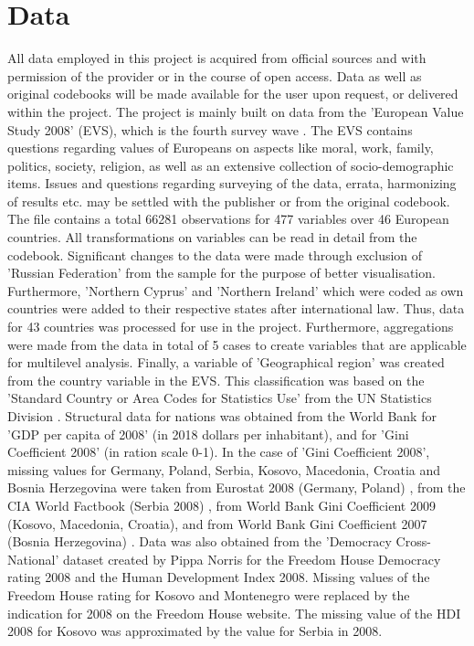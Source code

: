 \documentclass[preprint,12pt,authoryear]{elsarticle}
\begin{document}
\section{Data}
All data employed in this project is acquired from official sources and with permission of the provider or in the course of open access. Data as well as original codebooks will be made available for the user upon request, or delivered within the project.
The project is mainly built on data from the 'European Value Study 2008' (EVS), which is the fourth survey wave \citep{evs_european_2016}. The EVS contains questions regarding values of Europeans on aspects like moral, work, family, politics, society, religion, as well as an extensive collection of socio-demographic items. Issues and questions regarding surveying of the data, errata, harmonizing of results etc. may be settled with the publisher or from the original codebook. The file contains a total 66281 observations for 477 variables over 46 European countries. All transformations on variables can be read in detail from the codebook. Significant changes to the data were made through exclusion of 'Russian Federation' from the sample for the purpose of better visualisation. Furthermore, 'Northern Cyprus' and 'Northern Ireland' which were coded as own countries were added to their respective states after international law. Thus, data for 43 countries was processed for use in the project. Furthermore, aggregations were made from the data in total of 5 cases to create variables that are applicable for multilevel analysis. Finally, a variable of 'Geographical region' was created from the country variable in the EVS. This classification was based on the 'Standard Country or Area Codes for Statistics Use' from the UN Statistics Division \citep{unsd_standard_2019}.
Structural data for nations was obtained from the World Bank for 'GDP per capita of 2008' (in 2018 dollars per inhabitant)\citep{world_bank_gdp_2019}, and for 'Gini Coefficient 2008' (in ration scale 0-1)\citep{world_bank_gini_2019}. In the case of 'Gini Coefficient 2008', missing values for Germany, Poland, Serbia, Kosovo, Macedonia, Croatia and Bosnia Herzegovina were taken from Eurostat 2008 (Germany, Poland) \citep{eurostat_eurostat_2019}, from the CIA World Factbook (Serbia 2008) \citep{central_intelligence_agency_serbia_2019}, from World Bank Gini Coefficient 2009 (Kosovo, Macedonia, Croatia), and from World Bank Gini Coefficient 2007 (Bosnia Herzegovina) \citep{world_bank_gini_2019}. Data was also obtained from the 'Democracy Cross-National' dataset created by Pippa Norris \citep{norris_data_2015} for the Freedom House Democracy rating 2008 and the Human Development Index 2008. Missing values of the Freedom House rating for Kosovo \citep{freedom_house_kosovo_2012} and Montenegro \citep{freedom_house_montenegro_2012} were replaced by the indication for 2008 on the Freedom House website. The missing value of the HDI 2008 for Kosovo was approximated by the value for Serbia in 2008.
	
\end{document}
